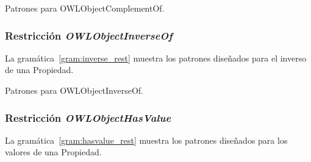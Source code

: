 \begin{GrammarEnv}
\begin{grammar}
\end{grammar}
\caption{Patrones para OWLObjectComplementOf.}\label{gram:complement_rest}
\end{GrammarEnv}

\subsubsection{Restricción \emph{OWLObjectInverseOf}}
La gramática~\ref{gram:inverse_rest} muestra los patrones diseñados para el inverso de una Propiedad.

\begin{GrammarEnv}
\begin{grammar}
\end{grammar}
\caption{Patrones para OWLObjectInverseOf.}\label{gram:inverse_rest}
\end{GrammarEnv}

\subsubsection{Restricción \emph{OWLObjectHasValue}}
La gramática~\ref{gram:hasvalue_rest} muestra los patrones diseñados para los valores de una Propiedad.

